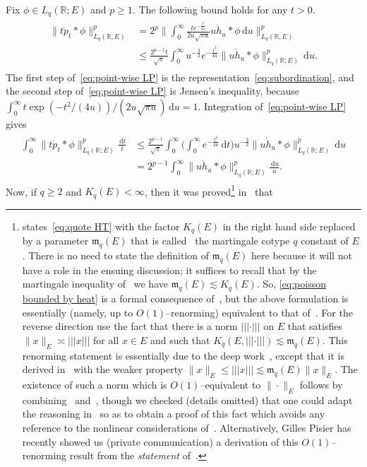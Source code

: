 \documentclass[11pt,reqno]{amsart}
\newcommand{\R}{\mathbb{R}}
\newcommand{\ud}[0]{\,\mathrm{d}}
\newcommand{\0}{\mathbf{0}}
\renewcommand{\1}{\mathbf 1}
\renewcommand{\ge}{\geqslant}
\renewcommand{\le}{\leqslant}
\theoremstyle{remark}
\begin{document}
Fix $\phi\in L_q(\R;E)$ and $p\ge 1$. The following bound holds for any $t>0$.
\begin{align}\label{eq:point-wise LP}
\begin{split}
\big\|t\dot{p}_t*\phi\big\|_{L_q(\R,E)}^p&=2^p \bigg\|\int_0^\infty \frac{te^{-\frac{t^2}{4u}}}{2u\sqrt{\pi u}} u\dot{h}_u*\phi \ud u\bigg\|_{L_q(\R,E)}^p\\ &\le \frac{2^{p-1}t}{\sqrt{\pi}}\int_0^\infty u^{-\frac{3}{2}} e^{-\frac{t^2}{4u}} \|u\dot{h}_u*\phi\|_{L_q(\R;E)}^p \ud u.
\end{split}
\end{align}
The first step of~\eqref{eq:point-wise LP} is the representation~\eqref{eq:subordination}, and the second step of~\eqref{eq:point-wise LP} is Jensen's inequality, because $\int_0^\infty t\exp(-t^2/(4u))/(2u\sqrt{\pi u})\ud u=1$. Integration of~\eqref{eq:point-wise LP} gives
\begin{align}\label{eq:poisson bounded by heat}
\begin{split}
\int_0^\infty \|t\dot{p}_t*\phi\|_{L_q(\R;E)}^p\frac{\ud t}{t}&\le \frac{2^{p-1}}{\sqrt{\pi}}\int_0^\infty \bigg(\int_0^\infty e^{-\frac{t^2}{4u}} \ud t \bigg) u^{-\frac{3}{2}}\|u\dot{h}_u*\phi\|_{L_q(\R;E)}^p \ud u\\&=2^{p-1} \int_0^\infty \|u\dot{h}_u*\phi\|_{L_q(\R;E)}^p\frac{\ud u}{u}.
\end{split}
\end{align}
Now, if $q\ge 2$ and $K_q(E)<\infty$, then it was proved\footnote{\cite{HN19} states~\eqref{eq:quote HT} with the factor $K_q(E)$ in the right hand side replaced by a parameter $\mathfrak{m}_q(E)$ that is called~\cite{Pis86-varenna} the martingale cotype $q$ constant of $E$. There is no need to state the definition of $\mathfrak{m}_q(E)$ here because it will not have a role in the ensuing discussion; it suffices to recall that by the martingale inequality of~\cite{Pis75} we have $\mathfrak{m}_q(E)\lesssim K_q(E)$. So, \eqref{eq:poisson bounded by heat} is a formal consequence of~\cite{HN19}, but the above formulation is essentially (namely, up to $O(1)$--renorming) equivalent to that of~\cite{HN19}. For the reverse direction use the fact that there is a  norm $|||\cdot|||$ on $E$ that satisfies $\|x\|_E\asymp  |||x|||$ for all $x\in E$ and such that $K_q(E,|||\cdot|||)\lesssim \mathfrak{m}_q(E)$. This renorming statement is essentially due to the deep work~\cite{Pis75}, except that it is derived in~\cite{Pis75} with the weaker property  $\|x\|_E\le |||x|||\lesssim \mathfrak{m}_q(E)\|x\|_E$. The existence of such a norm which is $O(1)$--equivalent to $\|\cdot\|_E$  follows by combining~\cite{LNP06} and~\cite{MN13}, though we checked (details omitted) that one could adapt the reasoning in~\cite{Pis75} so as to obtain a proof of this fact which avoids any reference to the nonlinear considerations of~\cite{LNP06,MN13}. Alternatively, Gilles Pisier has recently showed us (private communication) a derivation of this $O(1)$--renorming result from the {\em statement} of~\cite[Theorem~3.1]{Pis75}.} in~\cite{HN19} that
\end{document}
